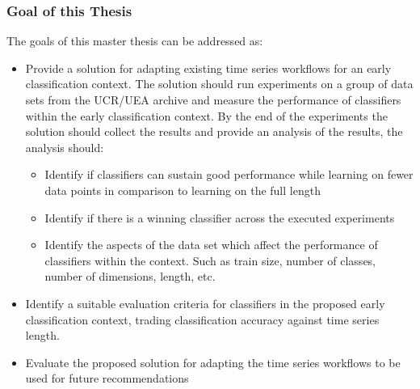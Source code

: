 \subsubsection*{Goal of this Thesis}
\label{thesisGoals}
The goals of this master thesis can be addressed as:

\begin{itemize}
    \item Provide a solution for adapting existing time series workflows for an early classification context. The solution should run experiments on a group of data sets from the UCR/UEA archive and measure the performance of classifiers within the early classification context. By the end of the experiments the solution should collect the results and provide an analysis of the results, the analysis should:
    \begin{itemize}
        \item Identify if classifiers can sustain good performance while learning on fewer data points in comparison to learning on the full length
        \item Identify if there is a winning classifier across the executed experiments
        \item Identify the aspects of the data set which affect the performance of classifiers within the context. Such as train size, number of classes, number of dimensions, length, etc.
    \end{itemize}
    \item Identify a suitable evaluation criteria for classifiers in the proposed early classification context, trading classification accuracy against time series length.
    \item Evaluate the proposed solution for adapting the time series workflows to be used for future recommendations
\end{itemize}

